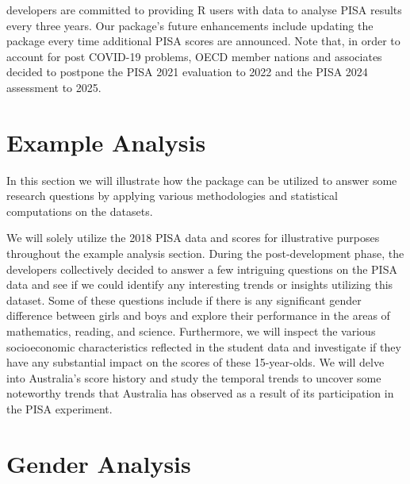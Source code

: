 developers are committed to providing R users
with data to analyse PISA results every three years. Our package's
future enhancements include updating the package every time additional
PISA scores are announced. Note that, in order to account for post
COVID-19 problems, OECD member nations and associates decided to
postpone the PISA 2021 evaluation to 2022 and the PISA 2024 assessment
to 2025.

\hypertarget{example-analysis}{%
\section{Example Analysis}\label{example-analysis}}

In this section we will illustrate how the 
package can be utilized to answer some research questions by applying
various methodologies and statistical computations on the
 datasets.

We will solely utilize the 2018 PISA data and scores for illustrative
purposes throughout the example analysis section. During the
post-development phase, the  developers
collectively decided to answer a few intriguing questions on the PISA
data and see if we could identify any interesting trends or insights
utilizing this dataset. Some of these questions include if there is any
significant gender difference between girls and boys and explore their
performance in the areas of mathematics, reading, and science.
Furthermore, we will inspect the various socioeconomic characteristics
reflected in the student data and investigate if they have any
substantial impact on the scores of these 15-year-olds. We will delve
into Australia's score history and study the temporal trends to uncover
some noteworthy trends that Australia has observed as a result of its
participation in the PISA experiment.

\hypertarget{gender-analysis}{%
\section{Gender Analysis}\label{gender-analysis}}

